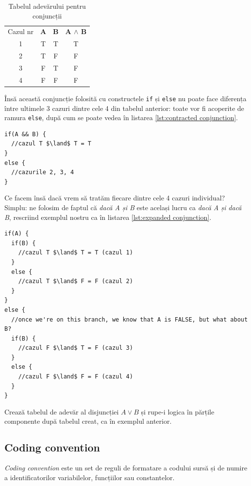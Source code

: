 \begin{table}[htp]
  \begin{center}
  \begin{tabular}{cccc}
  Cazul nr & \textbf{A} & \textbf{B} & \textbf{A $\land$ B}\\
  1 & T & T & T\\
  2 & T & F & F\\
  3 & F & T & F\\
  4 & F & F & F
  \end{tabular}
  \end{center}
  \caption{Tabelul adevărului pentru conjuncții}
  \label{tbl:truth table and}
\end{table}

Însă această conjuncție folosită cu constructele \texttt{if} și
\texttt{else} nu poate face diferența între ultimele 3 cazuri dintre
cele 4 din tabelul anterior: toate vor fi acoperite de ramura \texttt{else}, după
cum se poate vedea în listarea \ref{lst:contracted conjunction}.

\begin{lstlisting}[float=htp,mathescape,label=lst:contracted conjunction,caption=O singură conjuncție]
if(A && B) {
  //cazul T $\land$ T = T
}
else {
  //cazurile 2, 3, 4
}
\end{lstlisting}

Ce facem însă dacă vrem să tratăm fiecare dintre cele 4 cazuri individual?
Simplu: ne folosim de faptul că \textit{dacă A și B} este același lucru ca
\textit{dacă A și dacă B}, rescriind exemplul nostru ca în listarea \ref{lst:expanded conjunction}.

\begin{lstlisting}[float=htp,mathescape,label=lst:expanded conjunction,caption=După extinderea conjuncției]
if(A) {
  if(B) {
    //cazul T $\land$ T = T (cazul 1)
  }
  else {
    //cazul T $\land$ F = F (cazul 2)
  }
}
else {
  //once we're on this branch, we know that A is FALSE, but what about B?
  if(B) {
    //cazul F $\land$ T = F (cazul 3)
  }
  else {
    //cazul F $\land$ F = F (cazul 4)
  }
}
\end{lstlisting}

\begin{Exercise}[title={Breaking down the logic of a disjunction},difficulty=1]
Crează tabelul de adevăr al disjuncției $A \lor B$ și rupe-i logica în părțile
componente după tabelul creat, ca în exemplul anterior.
\end{Exercise}

\subsection{Coding convention}
\textsl{Coding convention} este un set de reguli de formatare a codului sursă
și de numire a identificatorilor variabilelor, funcțiilor sau constantelor.

